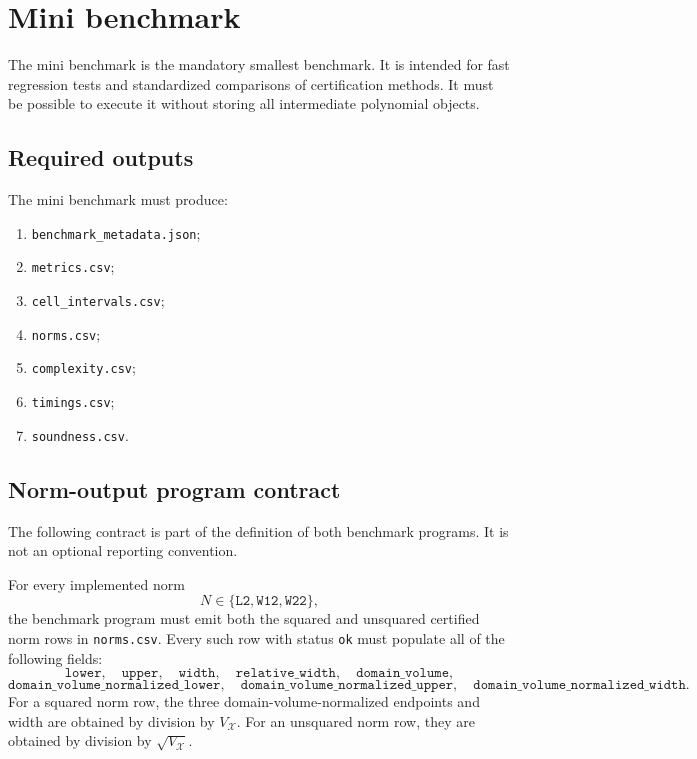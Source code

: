\documentclass[11pt]{article}
\begin{document}
\section{Mini benchmark}

The mini benchmark is the mandatory smallest benchmark.  It is intended for
fast regression tests and standardized comparisons of certification methods.
It must be possible to execute it without storing all intermediate polynomial
objects.

\subsection{Required outputs}

The mini benchmark must produce:
\begin{enumerate}[label=\arabic*.]
 \item \texttt{benchmark\_metadata.json};
 \item \texttt{metrics.csv};
 \item \texttt{cell\_intervals.csv};
 \item \texttt{norms.csv};
 \item \texttt{complexity.csv};
 \item \texttt{timings.csv};
 \item \texttt{soundness.csv}.
\end{enumerate}

\subsection{Norm-output program contract}

The following contract is part of the definition of both benchmark programs.
It is not an optional reporting convention.

For every implemented norm
\[
 N\in\{\texttt{L2},\texttt{W12},\texttt{W22}\},
\]
the benchmark program must emit both the squared and unsquared certified norm
rows in \texttt{norms.csv}.  Every such row with status \texttt{ok} must
populate all of the following fields:
\[
 \texttt{lower},\quad \texttt{upper},\quad \texttt{width},\quad
 \texttt{relative\_width},\quad \texttt{domain\_volume},
\]
\[
 \texttt{domain\_volume\_normalized\_lower},\quad
 \texttt{domain\_volume\_normalized\_upper},\quad
 \texttt{domain\_volume\_normalized\_width}.
\]
For a squared norm row, the three domain-volume-normalized endpoints and width
are obtained by division by \(V_{\mathcal X}\).  For an unsquared norm row,
they are obtained by division by \(\sqrt{V_{\mathcal X}}\).
\end{document}
